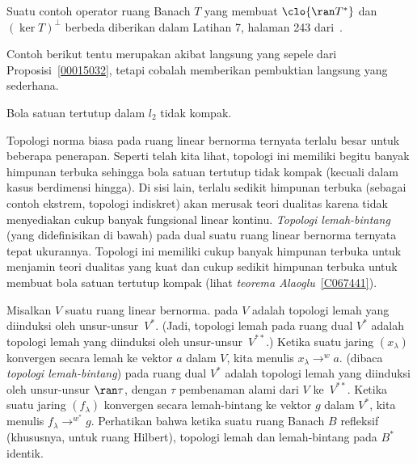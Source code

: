 \begin{exam} Suatu contoh operator ruang Banach $T$ yang membuat $\clo{\ran T^*}$ dan $(\ker T)^\perp$ berbeda
diberikan dalam Latihan 7, halaman 243 dari~\cite{BrownP:1970}.
\end{exam}

Contoh berikut tentu merupakan akibat langsung yang sepele dari Proposisi~\ref{00015032}, tetapi cobalah memberikan
pembuktian langsung yang sederhana.

\begin{exam}\label{X_l2ball_not_cpt} Bola satuan tertutup dalam $l_2$ tidak kompak.
\end{exam}

Topologi norma biasa pada ruang linear bernorma ternyata terlalu besar untuk beberapa penerapan.  Seperti telah kita lihat,
topologi ini memiliki begitu banyak himpunan terbuka sehingga bola satuan tertutup tidak kompak (kecuali dalam kasus berdimensi hingga). Di
sisi lain, terlalu sedikit himpunan terbuka (sebagai contoh ekstrem, topologi indiskret) akan merusak teori dualitas karena tidak
menyediakan cukup banyak fungsional linear kontinu.  \emph{Topologi lemah-bintang} (yang didefinisikan
di bawah) pada dual suatu ruang linear bernorma ternyata tepat ukurannya.  Topologi ini memiliki cukup banyak himpunan terbuka untuk menjamin
teori dualitas yang kuat dan cukup sedikit himpunan terbuka untuk membuat bola satuan tertutup kompak
(lihat \emph{teorema Alaoglu}~\ref{C067441}).

\begin{defn}\label{C067434} Misalkan $V$ suatu ruang linear bernorma. 
 pada $V$ adalah topologi lemah yang diinduksi oleh unsur-unsur~$V^*$. (Jadi,
topologi lemah pada ruang dual $V^*$ adalah topologi lemah yang diinduksi oleh
unsur-unsur~$V^{**}$.) Ketika suatu jaring $(x_\lambda)$ konvergen secara lemah ke vektor $a$ dalam $V$,
kita menulis
$x_\lambda \to^w a$. 
 (dibaca \emph{topologi lemah-bintang}) pada ruang dual $V^*$ adalah
topologi lemah yang diinduksi oleh unsur-unsur $\ran \tau$, dengan $\tau$ pembenaman alami
dari $V$ ke~$V^{**}$.  Ketika suatu jaring $(f_\lambda)$ konvergen secara lemah-bintang ke vektor $g$
dalam $V^*$, kita menulis
$f_\lambda \to^{w^*} g$. Perhatikan bahwa ketika suatu ruang Banach $B$ refleksif (khususnya, untuk ruang
Hilbert), topologi lemah dan lemah-bintang pada $B^*$ identik.
\end{defn}

